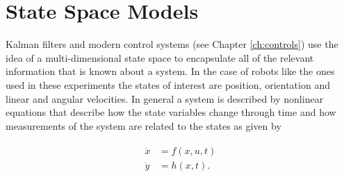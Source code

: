 

\section{State Space Models}
\label{sec:statespacemodels}
Kalman filters and modern control systems (see Chapter \ref{ch:controls}) use the idea of a multi-dimensional state space to encapsulate all of the relevant information that is known about a system. In the case of robots like the ones used in these experiments the states of interest are position, orientation and linear and angular velocities. In general a system is described by nonlinear equations that describe how the state variables change through time and how measurements of the system are related to the states as given by

\begin{align}
\label{eq:statespace}
\begin{split}
\dot{x} &= f(x,u,t) \\
\dot{y} &= h(x,t).
\end{split}
\end{align}

